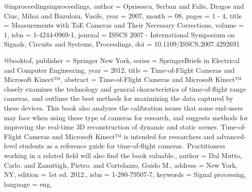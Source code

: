 @inproceedings{inproceedings,
author = {Oprisescu, Serban and Falie, Dragos and Ciuc, Mihai and Buzuloiu, Vasile},
year = {2007},
month = {08},
pages = {1 - 4},
title = {Measurements with ToE Cameras and Their Necessary Corrections},
volume = {1},
isbn = {1-4244-0969-1},
journal = {ISSCS 2007 - International Symposium on Signals, Circuits and Systems, Proceedings},
doi = {10.1109/ISSCS.2007.4292691}
}


@book{tof,
publisher = {Springer New York},
series = {SpringerBriefs in Electrical and Computer Engineering},
year = {2012},
title = {Time-of-Flight Cameras and Microsoft Kinect™},
abstract = {Time-of-Flight Cameras and Microsoft Kinect™ closely examines the technology and general characteristics of time-of-flight range cameras, and outlines the best methods for maximizing the data captured by these devices. This book also analyzes the calibration issues that some end-users may face when using these type of cameras for research, and suggests methods for improving the real-time 3D reconstruction of dynamic and static scenes. Time-of-Flight Cameras and Microsoft Kinect™ is intended for researchers and advanced-level students as a reference guide for time-of-flight cameras. Practitioners working in a related field will also find the book valuable.},
author = {Dal Mutto, Carlo. and Zanuttigh, Pietro. and Cortelazzo, Guido M.},
address = {New York, NY},
edition = {1st ed. 2012.},
isbn = {1-280-79507-7},
keywords = {Signal processing},
language = {eng},
}


